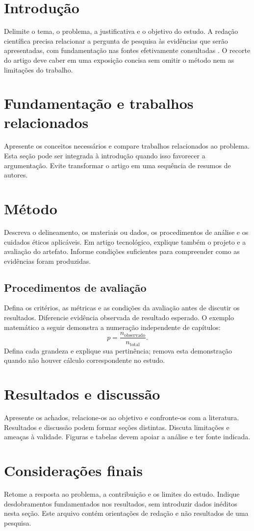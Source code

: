 \section{Introdução}
\label{sec:artigo-introducao}
Delimite o tema, o problema, a justificativa e o objetivo do estudo. A redação
científica precisa relacionar a pergunta de pesquisa às evidências que serão
apresentadas, com fundamentação nas fontes efetivamente consultadas
. O recorte do artigo deve caber em uma exposição concisa
sem omitir o método nem as limitações do trabalho.

\section{Fundamentação e trabalhos relacionados}
Apresente os conceitos necessários e compare trabalhos relacionados ao problema.
Esta seção pode ser integrada à introdução quando isso favorecer a argumentação.
Evite transformar o artigo em uma sequência de resumos de autores.

\section{Método}
Descreva o delineamento, os materiais ou dados, os procedimentos de análise e os
cuidados éticos aplicáveis. Em artigo tecnológico, explique também o projeto e a
avaliação do artefato. Informe condições suficientes para compreender como as
evidências foram produzidas.

\subsection{Procedimentos de avaliação}
Defina os critérios, as métricas e as condições da avaliação antes de discutir os
resultados. Diferencie evidência observada de resultado esperado. O exemplo
matemático a seguir demonstra a numeração independente de capítulos:
\begin{equation}
  p = \frac{n_{\mathrm{observado}}}{n_{\mathrm{total}}}.
  \label{eq:artigo-proporcao}
\end{equation}
Defina cada grandeza e explique sua pertinência; remova esta demonstração quando
não houver cálculo correspondente no estudo.

\section{Resultados e discussão}
Apresente os achados, relacione-os ao objetivo e confronte-os com a literatura.
Resultados e discussão podem formar seções distintas. Discuta limitações e
ameaças à validade. Figuras e tabelas devem apoiar a análise e ter fonte indicada.

\section{Considerações finais}
Retome a resposta ao problema, a contribuição e os limites do estudo. Indique
desdobramentos fundamentados nos resultados, sem introduzir dados inéditos nesta
seção. Este arquivo contém orientações de redação e não resultados de uma pesquisa.
